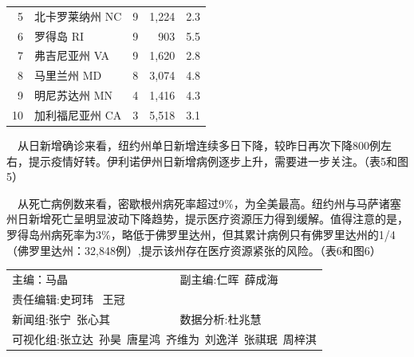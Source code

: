 \documentclass[]{article}
\begin{document}
\begin{table}[H]
\begin{minipage}{.7\linewidth}
\begin{table}[H]
\begin{tabular}{rlrrr}
5 & 北卡罗莱纳州 NC & 9 & 1,224 & 2.3\\
\rowcolor{gray!6}  6 & 罗得岛 RI & 9 & 903 & 5.5\\
7 & 弗吉尼亚州 VA & 9 & 1,620 & 2.8\\
\rowcolor{gray!6}  8 & 马里兰州 MD & 8 & 3,074 & 4.8\\
9 & 明尼苏达州 MN & 4 & 1,416 & 4.3\\
\rowcolor{gray!6}  10 & 加利福尼亚州 CA & 3 & 5,518 & 3.1\\
\bottomrule
\end{tabular}
\end{table} \end{minipage} 
\end{table}

\(\quad\)从日新增确诊来看，纽约州单日新增连续多日下降，较昨日再次下降800例左右，提示疫情好转。伊利诺伊州日新增病例逐步上升，需要进一步关注。（表5和图5）

\(\quad\)从死亡病例数来看，密歇根州病死率超过9\%，为全美最高。纽约州与马萨诸塞州日新增死亡呈明显波动下降趋势，提示医疗资源压力得到缓解。值得注意的是，罗得岛州病死率为3\%，略低于佛罗里达州，但其累计病例只有佛罗里达州的1/4（佛罗里达州：32,848例）,提示该州存在医疗资源紧张的风险。（表6和图6）

\vspace{5mm}

\centering
\small
\begin{tabular}{ll}

主编：马晶  &  副主编:仁晖\,  薛成海  \\
责任编辑:史珂玮 \, 王冠  \\
新闻组:张宁\, 张心其  & 数据分析:杜兆慧 \\
\multicolumn{2}{l}{可视化组:张立达\, 孙昊\, 唐星鸿\, 齐维为\, 刘逸洋\, 张祺珉\, 周梓淇}

\end{tabular}
\end{document}
